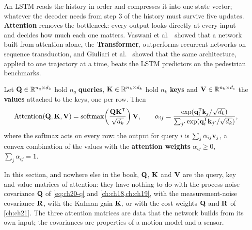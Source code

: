An LSTM reads the history in order and compresses it into one state vector;
whatever the decoder needs from step $3$ of the history must survive five
updates. \textbf{Attention} removes the bottleneck: every
output looks directly at every input and decides how much each one matters.
Vaswani et al.~\cite{vaswani2017attention} showed that a network built from
attention alone, the \textbf{Transformer}, outperforms
recurrent networks on sequence transduction, and Giuliari et
al.~\cite{giuliari2021transformer} showed that the same architecture, applied
to one trajectory at a time, beats the LSTM predictors on the pedestrian
benchmarks.

\begin{definition}
\label{def:ch20-attention}
Let $\mathbf{Q} \in \mathbb{R}^{n_q \times d_k}$ hold $n_q$ \textbf{queries}, $\mathbf{K} \in
\mathbb{R}^{n_k \times d_k}$ hold $n_k$ \textbf{keys} and $\mathbf{V} \in \mathbb{R}^{n_k \times d_v}$
the \textbf{values} attached to the keys, one per row. Then
\begin{equation}
  \operatorname{Attention}(\mathbf{Q}, \mathbf{K}, \mathbf{V})
  = \operatorname{softmax}\!\left(\frac{\mathbf{Q}\mathbf{K}^{\mathsf{T}}}{\sqrt{d_k}}\right)\mathbf{V},
  \qquad
  \alpha_{ij} = \frac{\exp(\mathbf{q}_i^{\mathsf{T}}\mathbf{k}_j/\sqrt{d_k})}{\sum_{j'}\exp(\mathbf{q}_i^{\mathsf{T}}\mathbf{k}_{j'}/\sqrt{d_k})},
  \label{eq:ch20-attention}
\end{equation}
where the softmax acts on every row: the output for query $i$ is
$\sum_j \alpha_{ij}\mathbf{v}_j$, a convex combination of the values with the
\textbf{attention weights} $\alpha_{ij} \ge 0$, $\sum_j \alpha_{ij} = 1$.
\end{definition}

\begin{pitfall}
In this section, and nowhere else in the book, $\mathbf{Q}$, $\mathbf{K}$ and
$\mathbf{V}$ are the query, key and value matrices of attention: they have
nothing to do with the process-noise covariance $\mathbf{Q}$ of
\cref{eq:ch20-q} and \cref{ch:ch18,ch:ch19}, with the measurement-noise
covariance $\mathbf{R}$, with the Kalman gain $\mathbf{K}$, or with the cost
weights $\mathbf{Q}$ and $\mathbf{R}$ of \cref{ch:ch21}. The three attention
matrices are data that the network builds from its own input; the
covariances are properties of a motion model and a sensor.
\end{pitfall}

